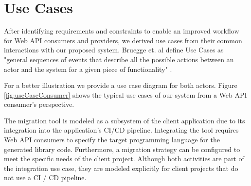 \section{Use Cases}
\label{sec:UseCases}

After identifying requirements and constraints to enable an improved workflow for Web API consumers and providers, we derived use cases from their common interactions with our proposed system. Bruegge et. al define Use Cases as "general sequences of events that describe all the possible actions between an actor and the system for a given piece of functionality" \cite{bruegge_object-oriented_2010}.

For a better illustration we provide a use case diagram for both actors. Figure \ref{fig:useCaseConsumer} shows the typical use cases of our system from a Web API consumer's perspective.

\begin{figure}[h]
\end{figure}

The migration tool is modeled as a subsystem of the client application due to its integration into the application's CI/CD pipeline. Integrating the tool requires Web API consumers to specify the target programming language for the generated library code. Furthermore, a migration strategy can be configured to meet the specific needs of the client project. Although both activities are part of the integration use case, they are modeled explicitly for client projects that do not use a CI / CD pipeline. 

